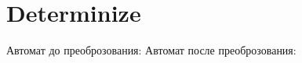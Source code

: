 \section{Determinize}
\begin{frame}{}
	Автомат до преоброзования:
	Автомат после преоброзования:
\end{frame}
